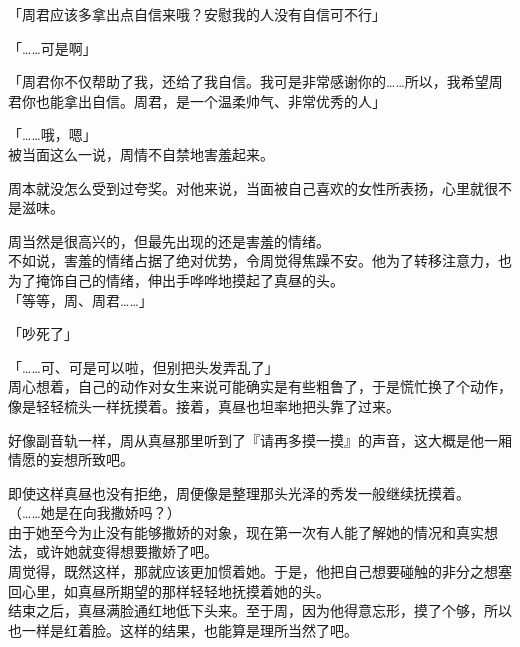 「周君应该多拿出点自信来哦？安慰我的人没有自信可不行」

「……可是啊」

「周君你不仅帮助了我，还给了我自信。我可是非常感谢你的……所以，我希望周君你也能拿出自信。周君，是一个温柔帅气、非常优秀的人」

「……哦，嗯」\\

被当面这么一说，周情不自禁地害羞起来。

周本就没怎么受到过夸奖。对他来说，当面被自己喜欢的女性所表扬，心里就很不是滋味。

周当然是很高兴的，但最先出现的还是害羞的情绪。\\

不如说，害羞的情绪占据了绝对优势，令周觉得焦躁不安。他为了转移注意力，也为了掩饰自己的情绪，伸出手哗哗地摸起了真昼的头。\\

「等等，周、周君……」

「吵死了」

「……可、可是可以啦，但别把头发弄乱了」\\

周心想着，自己的动作对女生来说可能确实是有些粗鲁了，于是慌忙换了个动作，像是轻轻梳头一样抚摸着。接着，真昼也坦率地把头靠了过来。

好像副音轨一样，周从真昼那里听到了『请再多摸一摸』的声音，这大概是他一厢情愿的妄想所致吧。

即使这样真昼也没有拒绝，周便像是整理那头光泽的秀发一般继续抚摸着。\\

（……她是在向我撒娇吗？）\\

由于她至今为止没有能够撒娇的对象，现在第一次有人能了解她的情况和真实想法，或许她就变得想要撒娇了吧。\\

周觉得，既然这样，那就应该更加惯着她。于是，他把自己想要碰触的非分之想塞回心里，如真昼所期望的那样轻轻地抚摸着她的头。\\

结束之后，真昼满脸通红地低下头来。至于周，因为他得意忘形，摸了个够，所以也一样是红着脸。这样的结果，也能算是理所当然了吧。
